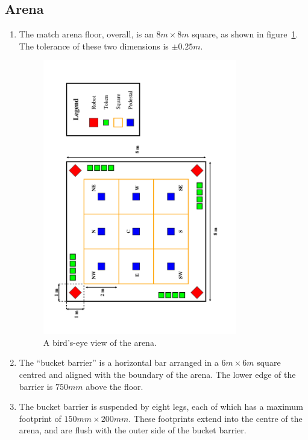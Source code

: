 \subsection{Arena}
\label{sub:arena}
\begin{enumerate}
\item The match arena floor, overall, is an $8m \times 8m$ square, as shown in figure~\ref{fig:arena-dim}.
      The tolerance of these two dimensions is $\pm0.25m$.

\begin{figure}
  \centering
  \includegraphics[width=0.8\textwidth]{./images/arena.pdf}
  \caption{\label{fig:arena-dim}A bird's-eye view of the arena.}
\end{figure}

\item The ``bucket barrier'' is a horizontal bar arranged in a $6m \times 6m$ square centred and aligned with the boundary of the arena.
      The lower edge of the barrier is $750mm$ above the floor.

\item The bucket barrier is suspended by eight legs, each of which has a maximum footprint of $150mm \times 200mm$.
      These footprints extend into the centre of the arena, and are flush with the outer side of the bucket barrier.


\end{enumerate}
